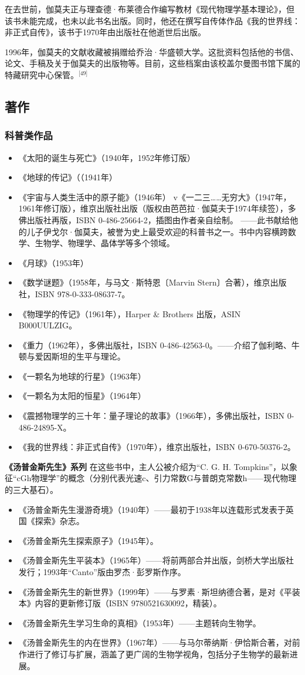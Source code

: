 在去世前，伽莫夫正与理查德·布莱德合作编写教材《现代物理学基本理论》，但该书未能完成，也未以此书名出版。同时，他还在撰写自传体作品《我的世界线：非正式自传》，该书于1970年由出版社在他逝世后出版。

1996年，伽莫夫的文献收藏被捐赠给乔治·华盛顿大学。这批资料包括他的书信、论文、手稿及关于伽莫夫的出版物等。目前，这些档案由该校盖尔曼图书馆下属的特藏研究中心保管。\(^\text{[49]}\)
\subsection{著作}
\subsubsection{科普类作品}
\begin{itemize}
\item 《太阳的诞生与死亡》（1940年，1952年修订版）
\item 《地球的传记》（（1941年）
\item 《宇宙与人类生活中的原子能》（1946年）
v《一二三……无穷大》（1947年，1961年修订版），维京出版社出版（版权由芭芭拉·伽莫夫于1974年续签），多佛出版社再版，ISBN 0-486-25664-2，插图由作者亲自绘制。
  ——此书献给他的儿子伊戈尔·伽莫夫，被誉为史上最受欢迎的科普书之一。书中内容横跨数学、生物学、物理学、晶体学等多个领域。
\item 《月球》（1953年）
\item 《数学谜题》（1958年，与马文·斯特恩〔Marvin Stern〕合著），维京出版社，ISBN 978-0-333-08637-7。
\item 《物理学的传记》（1961年），Harper & Brothers 出版，ASIN B000UULZIG。
\item 《重力（1962年），多佛出版社，ISBN 0-486-42563-0。——介绍了伽利略、牛顿与爱因斯坦的生平与理论。
\item 《一颗名为地球的行星》（1963年）
\item 《一颗名为太阳的恒星》（1964年）
\item 《震撼物理学的三十年：量子理论的故事》（1966年），多佛出版社，ISBN 0-486-24895-X。
\item 《我的世界线：非正式自传》（1970年），维京出版社，ISBN 0-670-50376-2。
\end{itemize}
\textbf{《汤普金斯先生》系列}
在这些书中，主人公被介绍为“C. G. H. Tompkins”，以象征“cGh物理学”的概念（分别代表光速c、引力常数G与普朗克常数h——现代物理的三大基石）。
\begin{itemize}
\item 《汤普金斯先生漫游奇境》（1940年）——最初于1938年以连载形式发表于英国《探索》杂志。
\item 《汤普金斯先生探索原子》（1945年）。
\item 《汤普金斯先生平装本》（1965年）——将前两部合并出版，剑桥大学出版社发行；1993年“Canto”版由罗杰·彭罗斯作序。
\item 《汤普金斯先生的新世界》（1999年）——与罗素·斯坦纳德合著，是对《平装本》内容的更新修订版（ISBN 9780521630092，精装）。
\item 《汤普金斯先生学习生命的真相》（1953年）——主题转向生物学。
\item 《汤普金斯先生的内在世界》（1967年）——与马尔蒂纳斯·伊恰斯合著，对前作进行了修订与扩展，涵盖了更广阔的生物学视角，包括分子生物学的最新进展。
\end{itemize}
